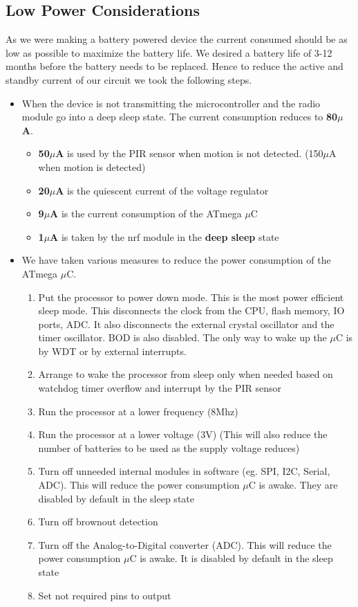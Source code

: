 \subsection{Low Power Considerations}
As we were making a battery powered device the current consumed should be as low as possible to maximize the battery life.
We desired a battery life of 3-12 months before the battery needs to be replaced. Hence to reduce the active and standby current of our circuit we took the following steps.

\begin{itemize}	
\item When the device is not transmitting the microcontroller and the radio module go into a deep sleep state. The current consumption reduces to \textbf{80$\mu$A}. 
\begin{itemize}
	\item \textbf{50$\mu$A} is used by the PIR sensor when motion is not detected. (150$\mu$A when motion is detected)
	\item \textbf{20$\mu$A} is the quiescent current of the voltage regulator
	\item \textbf{9$\mu$A} is the current consumption of the ATmega $\mu$C
	\item \textbf{1$\mu$A} is taken by the nrf module in the \textbf{deep sleep} state
\end{itemize}

\item We have taken various measures to reduce the power consumption of the ATmega $\mu$C.
	\begin{enumerate}
		\item Put the processor to power down mode. This is the most power efficient sleep mode. This disconnects the clock from the CPU, flash memory, IO ports, ADC. It also disconnects the external crystal oscillator and the timer oscillator. BOD is also disabled. The only way to wake up the $\mu$C is by WDT or by external interrupts.
		\item Arrange to wake the processor from sleep only when needed based on watchdog timer overflow and interrupt by the PIR sensor
		\item Run the processor at a lower frequency (8Mhz)
		\item Run the processor at a lower voltage (3V) (This will also reduce the number of batteries to be used as the supply voltage reduces)
		\item Turn off unneeded internal modules in software (eg. SPI, I2C, Serial, ADC). This will reduce the power consumption $\mu$C is awake. They are disabled by default in the sleep state
		\item Turn off brownout detection
		\item Turn off the Analog-to-Digital converter (ADC). This will reduce the power consumption $\mu$C is awake. It is disabled by default in the sleep state
		\item Set not required pins to output
	\end{enumerate} 


\end{itemize}
